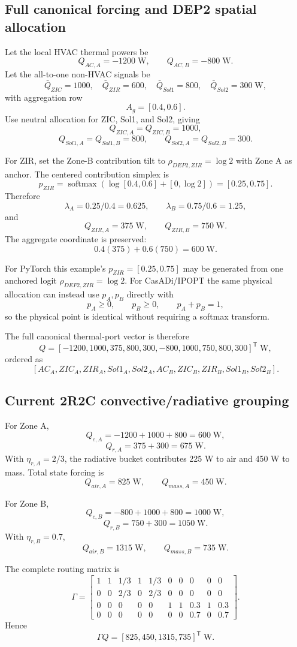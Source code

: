 \documentclass[11pt]{article}
\newcommand{\softmax}{\operatorname{softmax}}
\begin{document}
\subsection{Full canonical forcing and DEP2 spatial allocation}
Let the local HVAC thermal powers be
\[
Q_{AC,A}=-1200\;\text{W},\qquad Q_{AC,B}=-800\;\text{W}.
\]
Let the all-to-one non-HVAC signals be
\[
\bar Q_{ZIC}=1000,\quad
\bar Q_{ZIR}=600,\quad
\bar Q_{Sol1}=800,\quad
\bar Q_{Sol2}=300\;\text{W},
\]
with aggregation row
\[
A_g=[0.4,0.6].
\]
Use neutral allocation for ZIC, Sol1, and Sol2, giving
\[
Q_{ZIC,A}=Q_{ZIC,B}=1000,
\]
\[
Q_{Sol1,A}=Q_{Sol1,B}=800,
\qquad
Q_{Sol2,A}=Q_{Sol2,B}=300.
\]

For ZIR, set the Zone-B contribution tilt to $\rho_{DEP2,ZIR}=\log2$ with Zone A
as anchor. The centered contribution simplex is
\[
p_{ZIR}=\softmax(\log[0.4,0.6]+[0,\log2])=[0.25,0.75].
\]
Therefore
\[
\lambda_A=0.25/0.4=0.625,
\qquad
\lambda_B=0.75/0.6=1.25,
\]
and
\[
\boxed{Q_{ZIR,A}=375\;\text{W},\qquad Q_{ZIR,B}=750\;\text{W}.}
\]
The aggregate coordinate is preserved:
\[
0.4(375)+0.6(750)=600\;\text{W}.
\]

For PyTorch this example's $p_{ZIR}=[0.25,0.75]$ may be generated from one
anchored logit $\rho_{DEP2,ZIR}=\log2$. For CasADi/IPOPT the same physical
allocation can instead use $p_A,p_B$ directly with
\[
p_A\ge0,\qquad p_B\ge0,\qquad p_A+p_B=1,
\]
so the physical point is identical without requiring a softmax transform.

The full canonical thermal-port vector is therefore
\[
\boxed{
Q=
[-1200,1000,375,800,300,-800,1000,750,800,300]^{\mathsf T}\;\text{W},
}
\]
ordered as
\[
[AC_A,ZIC_A,ZIR_A,Sol1_A,Sol2_A,
AC_B,ZIC_B,ZIR_B,Sol1_B,Sol2_B].
\]

\subsection{Current 2R2C convective/radiative grouping}
For Zone A,
\[
Q_{c,A}=-1200+1000+800=\boxed{600\;\text{W}},
\]
\[
Q_{r,A}=375+300=\boxed{675\;\text{W}}.
\]
With $\eta_{r,A}=2/3$, the radiative bucket contributes 225 W to air and 450 W
to mass. Total state forcing is
\[
\boxed{Q_{air,A}=825\;\text{W},\qquad Q_{mass,A}=450\;\text{W}.}
\]

For Zone B,
\[
Q_{c,B}=-800+1000+800=\boxed{1000\;\text{W}},
\]
\[
Q_{r,B}=750+300=\boxed{1050\;\text{W}}.
\]
With $\eta_{r,B}=0.7$,
\[
\boxed{Q_{air,B}=1315\;\text{W},\qquad Q_{mass,B}=735\;\text{W}.}
\]

The complete routing matrix is
\[
\boxed{
\Gamma=
\begin{bmatrix}
1&1&1/3&1&1/3&0&0&0&0&0\\
0&0&2/3&0&2/3&0&0&0&0&0\\
0&0&0&0&0&1&1&0.3&1&0.3\\
0&0&0&0&0&0&0&0.7&0&0.7
\end{bmatrix}.
}
\]
Hence
\[
\boxed{\Gamma Q=[825,450,1315,735]^{\mathsf T}\;\text{W}.}
\]
\end{document}
